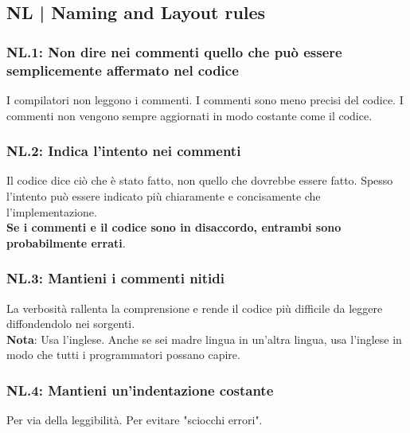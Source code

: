 
\subsection{NL | Naming and Layout rules}

\subsubsection{NL.1: Non dire nei commenti quello che può essere semplicemente affermato nel codice}

\textsf{\small I compilatori non leggono i commenti. I commenti sono meno precisi del codice. I commenti non vengono sempre aggiornati in modo costante come il codice.} \\

\subsubsection{NL.2: Indica l'intento nei commenti}

\textsf{\small Il codice dice ciò che è stato fatto, non quello che dovrebbe essere fatto. Spesso l'intento può essere indicato più chiaramente e concisamente che l'implementazione. } \\

\textsf{\small \textbf{Se i commenti e il codice sono in disaccordo, entrambi sono probabilmente errati}.} \\

\subsubsection{NL.3: Mantieni i commenti nitidi}

\textsf{\small La verbosità rallenta la comprensione e rende il codice più difficile da leggere diffondendolo nei sorgenti.} \\

\textsf{\small \textbf{Nota}: Usa l'inglese. Anche se sei madre lingua in un'altra lingua, usa l'inglese in modo che tutti i programmatori possano capire.} \\

\subsubsection{NL.4: Mantieni un'indentazione costante}

\textsf{\small Per via della leggibilità. Per evitare "sciocchi errori".} \\

